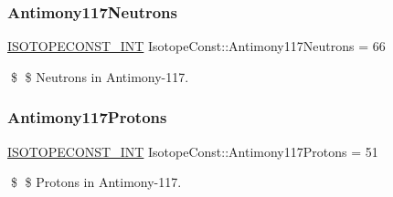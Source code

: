 \subsubsection{\texorpdfstring{Antimony117\+Neutrons}{Antimony117Neutrons}}
{\footnotesize\ttfamily \mbox{\hyperlink{group___isotope_const-_macros_ga5f18360b3e99483a35c32d789e62621c}{I\+S\+O\+T\+O\+P\+E\+C\+O\+N\+S\+T\+\_\+\+I\+NT}} Isotope\+Const\+::\+Antimony117\+Neutrons = 66}

\$ \$ Neutrons in Antimony-\/117. \mbox{\label{group___isotope_const-_antimony-_sb117_gae30b7d83a8d770a65cb46a4fe8f4743c}} 
\subsubsection{\texorpdfstring{Antimony117\+Protons}{Antimony117Protons}}
{\footnotesize\ttfamily \mbox{\hyperlink{group___isotope_const-_macros_ga5f18360b3e99483a35c32d789e62621c}{I\+S\+O\+T\+O\+P\+E\+C\+O\+N\+S\+T\+\_\+\+I\+NT}} Isotope\+Const\+::\+Antimony117\+Protons = 51}

\$ \$ Protons in Antimony-\/117. 